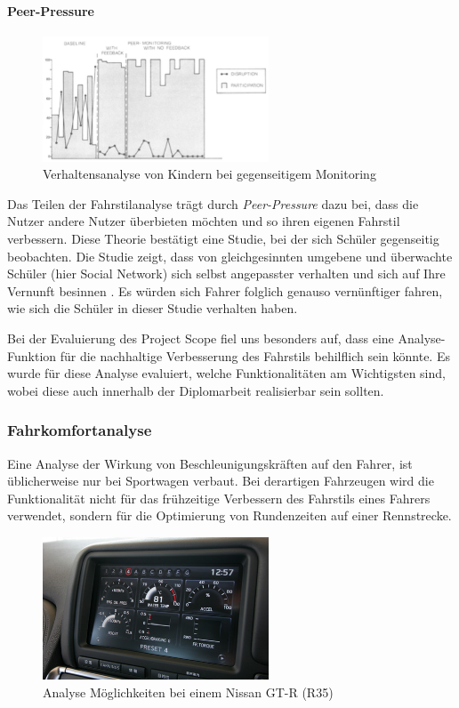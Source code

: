 \paragraph{Peer-Pressure} 
\begin{figure}\centering
    \includegraphics[width=0.6\textwidth]{images/peerPressure}
    \caption{Verhaltensanalyse von Kindern bei gegenseitigem Monitoring \cite{SIMR.CH1-fahrstil-analyse.PeerPressure}} \label{Fig:imgPeerPressure}
\end{figure}
Das Teilen der Fahrstilanalyse trägt durch \textit{Peer-Pressure}  dazu bei, dass die Nutzer andere Nutzer überbieten möchten und so ihren eigenen Fahrstil verbessern. Diese Theorie bestätigt eine Studie, bei der sich Schüler gegenseitig beobachten. Die Studie zeigt, dass von gleichgesinnten umgebene und überwachte Schüler (hier Social Network) sich selbst angepasster verhalten und sich auf Ihre Vernunft besinnen \cite{SIMR.CH1-fahrstil-analyse.PeerPressure}. Es würden sich Fahrer folglich genauso vernünftiger fahren, wie sich die Schüler in dieser Studie verhalten haben.

Bei der Evaluierung des Project Scope fiel uns besonders auf, dass eine Analyse-Funktion für die nachhaltige Verbesserung des Fahrstils behilflich sein könnte. Es wurde für diese Analyse evaluiert, welche Funktionalitäten am Wichtigsten sind, wobei diese auch innerhalb der Diplomarbeit realisierbar sein sollten.

\subsubsection{Fahrkomfortanalyse}
Eine Analyse der Wirkung von Beschleunigungskräften auf den Fahrer, ist üblicherweise nur bei Sportwagen verbaut. Bei derartigen Fahrzeugen wird die Funktionalität nicht für das frühzeitige Verbessern des Fahrstils eines Fahrers verwendet, sondern für die Optimierung von Rundenzeiten auf einer Rennstrecke.

\begin{figure}[!htb]\centering
	\includegraphics[width=0.6\textwidth]{images/gtrMultifunc}
	\caption{Analyse Möglichkeiten bei einem Nissan GT-R (R35) \cite{SIMR.CH1-Fahrstil-Analyse.GTRMultifunc}}\label{Fig:imgGTR}
\end{figure}

